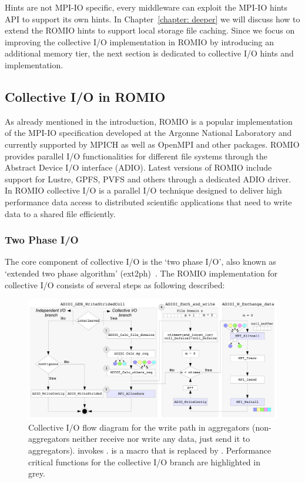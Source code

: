 Hints are not MPI-IO specific, every middleware can exploit the MPI-IO hints API to support its own hints. In Chapter~\ref{chapter: deeper} we will discuss how to extend the ROMIO hints to support local storage file caching. Since we focus on improving the collective I/O implementation in ROMIO by introducing an additional memory tier, the next section is dedicated to collective I/O hints and implementation.

\subsection{Collective I/O in ROMIO}
\label{subsec: collio}
As already mentioned in the introduction, ROMIO is a popular implementation of the MPI-IO specification developed at the Argonne National Laboratory and currently supported by MPICH as well as OpenMPI and other packages. ROMIO provides parallel I/O functionalities for different file systems through the Abstract Device I/O interface (ADIO). Latest versions of ROMIO include support for Lustre, GPFS, PVFS and others through a dedicated ADIO driver. In ROMIO collective I/O is a parallel I/O technique designed to deliver high performance data access to distributed scientific applications that need to write data to a shared file efficiently.

\subsubsection{Two Phase I/O}
\label{subsubsec: ext2ph}
The core component of collective I/O is the `two phase I/O', also known as `extended two phase algorithm' (ext2ph)~\cite{ThakurC96}. The ROMIO implementation for collective I/O consists of several steps as following described:

\begin{figure}[!htb]
  \centering
  \includegraphics[width=\textwidth]{chapters/chapter3/figures/ext2ph}
  \caption{Collective I/O flow diagram for the write path in aggregators (non-aggregators neither receive nor write any data, just send it to aggregators).  invokes .  is a macro that is replaced by . Performance critical functions for the collective I/O branch are highlighted in grey.}
  \label{figure: coll_io_impl}
\end{figure}

